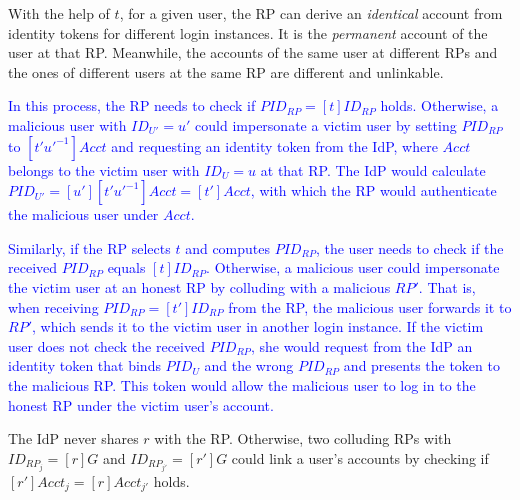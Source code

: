 With the help of $t$, for a given user, the RP can derive an \emph{identical} account from identity tokens for different login instances. It is the \emph{permanent} account of the user at that RP. Meanwhile, the accounts of the same user at different RPs and the ones of different users at the same RP are different and unlinkable.

\textcolor{blue}{In this process, the RP needs to check if $PID_{RP} = [t]ID_{RP}$ holds. Otherwise, a malicious user with $ID_{U'} = u'$ could impersonate a victim user by setting $PID_{RP}$ to $[t'u'^{-1}]Acct$ and requesting an identity token from the IdP, where $Acct$ belongs to the victim user with $ID_{U} = u$ at that RP. The IdP would calculate $PID_{U'} = [u'][t'u'^{-1}]Acct = [t']Acct$, with which the RP would authenticate the malicious user under $Acct$.} %

\textcolor{blue}{Similarly, if the RP selects $t$ and computes $PID_{RP}$, the user needs to check if the received $PID_{RP}$ equals $[t]ID_{RP}$. Otherwise, a malicious user could impersonate the victim user at an honest RP by colluding with a malicious $RP'$. That is, when receiving $PID_{RP}=[t']ID_{RP}$ from the RP, the malicious user forwards it to $RP'$, which sends it to the victim user in another login instance. If the victim user does not check the received $PID_{RP}$, she would request from the IdP an identity token that binds $PID_U$ and the wrong $PID_{RP}$ and presents the token to the malicious RP. This token would allow the malicious user to log in to the honest RP under the victim user's account.}

The IdP never shares $r$ with the RP. Otherwise, two colluding RPs with $ID_{RP_j} = [r]G$ and $ID_{RP_{j'}} = [r']G$ could link a user's accounts by checking if $[r']Acct_j = [r]Acct_{j'}$ holds.




